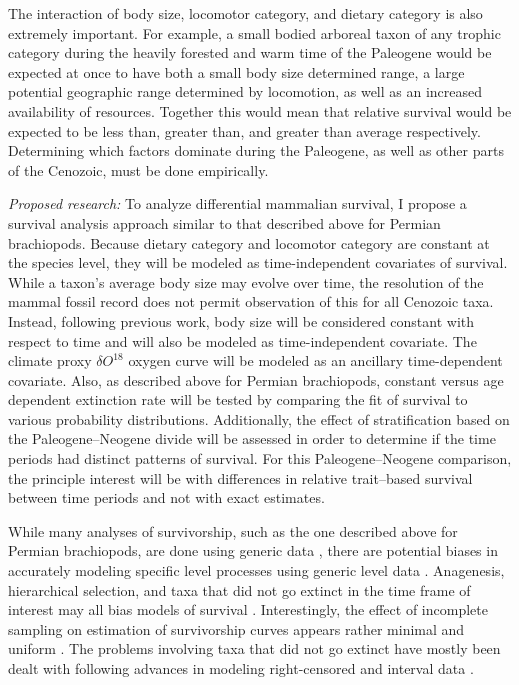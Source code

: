 \documentclass[12pt,letterpaper]{article}
\begin{document}
The interaction of body size, locomotor category, and dietary category is also extremely important. For example, a small bodied arboreal taxon of any trophic category during the heavily forested and warm time of the Paleogene would be expected at once to have both a small body size determined range, a large potential geographic range determined by locomotion, as well as an increased availability of resources. Together this would mean that relative survival would be expected to be less than, greater than, and greater than average respectively. Determining which factors dominate during the Paleogene, as well as other parts of the Cenozoic, must be done empirically.


\textit{Proposed research:}
To analyze differential mammalian survival, I propose a survival analysis approach similar to that described above for Permian brachiopods. Because dietary category and locomotor category are constant at the species level, they will be modeled as time-independent covariates of survival. While a taxon's average body size may evolve over time, the resolution of the mammal fossil record does not permit observation of this for all Cenozoic taxa. Instead, following previous work, body size will be considered constant with respect to time and will also be modeled as time-independent covariate. The climate proxy \(\delta O^{18}\) oxygen curve \citep{Zachos2008} will be modeled as an ancillary time-dependent covariate. Also, as described above for Permian brachiopods, constant versus age dependent extinction rate will be tested by comparing the fit of survival to various probability distributions. Additionally, the effect of stratification based on the Paleogene--Neogene divide will be assessed in order to determine if the time periods had distinct patterns of survival. For this Paleogene--Neogene comparison, the principle interest will be with differences in relative trait--based survival between time periods and not with exact estimates.

While many analyses of survivorship, such as the one described above for Permian brachiopods, are done using generic data \citep{Tomiya2013,Liow2008,Harnik2013}, there are potential biases in accurately modeling specific level processes using generic level data \citep{Raup1975,Sepkoski1975,Simpson2006,Raup1991a,VanValen1979}. Anagenesis, hierarchical selection, and taxa that did not go extinct in the time frame of interest may all bias models of survival \citep{Raup1975,VanValen1979,Simpson2006,Raup1991a}. Interestingly, the effect of incomplete sampling on estimation of survivorship curves appears rather minimal and uniform \citep{Sepkoski1975}. The problems involving taxa that did not go extinct have mostly been dealt with following advances in modeling right-censored and interval data \citep{Kleinbaum2005}.
\end{document}
